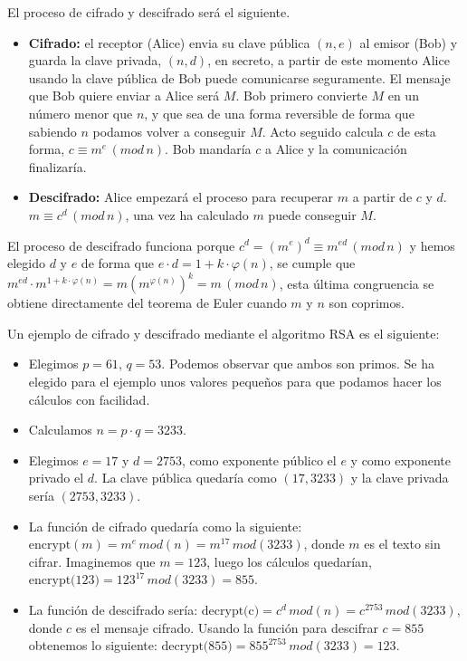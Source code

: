 El proceso de cifrado y descifrado será el siguiente.

\begin{itemize}
	\item \textbf{Cifrado:} el receptor (Alice) envia su clave pública $(n,e)$ al emisor (Bob) y guarda la clave privada, $(n,d)$, en secreto, a partir de este momento Alice usando la clave pública de Bob puede comunicarse seguramente. El mensaje que Bob quiere enviar a Alice será $M$. Bob primero convierte $M$ en un número menor que $n$, y que sea de una forma reversible de forma que sabiendo $n$ podamos volver a conseguir $M$. Acto seguido calcula $c$ de esta forma, $c\equiv m^e\,(mod\,n)$. Bob mandaría $c$ a Alice y la comunicación finalizaría.
	
	\item \textbf{Descifrado:} Alice empezará el proceso para recuperar $m$ a partir de $c$ y $d$. $m\equiv c^d\,(mod\,n)$, una vez ha calculado $m$ puede conseguir $M$.

\end{itemize}

El proceso de descifrado funciona porque $c^d=(m^e)^d\equiv m^{ed}\, (mod\, n)$ y hemos elegido $d$ y $e$ de forma que $e\cdot d =1+k\cdot\varphi(n)$, se cumple que $ m^{ed}\cdot m^{1+k\cdot\varphi(n)} = m(m^{\varphi(n)})^k = m\, (mod\, n)$, esta última congruencia se obtiene directamente del teorema de Euler cuando $m$ y $n$ son coprimos.

Un ejemplo de cifrado y descifrado mediante el algoritmo RSA es el siguiente:

\begin{itemize}

\item Elegimos $p=61$, $q=53$. Podemos observar que ambos son primos. Se ha elegido para el ejemplo unos valores pequeños para que podamos hacer los cálculos con facilidad.

\item Calculamos $n=p\cdot q= 3233$.

\item Elegimos $e=17$ y $d=2753$, como exponente público el $e$ y como exponente privado el $d$. La clave pública quedaría como $(17, 3233)$ y la clave privada sería $(2753, 3233)$.

\item La función de cifrado quedaría como la siguiente: $\mbox{encrypt}(m) = m^e \,mod(n) = m^{17}\,mod(3233)$, donde $m$ es el texto sin cifrar. Imaginemos que $m=123$, luego los cálculos quedarían, $\mbox{encrypt(123)} = 123^{17}\,mod(3233) = 855$.

\item La función de descifrado sería: $\mbox{decrypt(c)} = c^d\,mod(n) = c^{2753}\,mod(3233)$, donde $c$ es el mensaje cifrado. Usando la función para descifrar $c=855$ obtenemos lo siguiente: $\mbox{decrypt(855)} = 855^{2753}\,mod(3233) = 123$.

\end{itemize}

